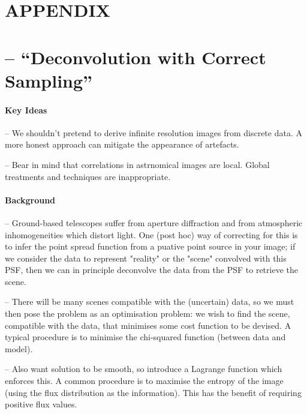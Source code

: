 \documentclass[letterpaper, 11pt]{article}
\begin{document}
\newpage
\appendix
{}
\section*{APPENDIX}

\section{\citet{MCS98} -- ``Deconvolution with Correct Sampling''}
\label{sec:MCS98notes}

\paragraph{Key Ideas}

-- We shouldn't pretend to derive infinite resolution images from discrete data. A more honest approach can mitigate the appearance of 
artefacts.

-- Bear in mind that correlations in astrnomical images are local. Global treatments and techniques are inappropriate.


\paragraph{Background}

-- Ground-based telescopes suffer from aperture diffraction and from atmospheric inhomogeneities which distort light. One (post hoc) way of 
correcting for this is to infer the point spread function from a puative point source in your image; if we consider the data to represent 
"reality" or the "scene" convolved with this PSF, then we can in principle deconvolve the data from the PSF to retrieve the scene. 

-- There will be many scenes compatible with the (uncertain) data, so we must then pose the problem as an optimisation problem: we wish to 
find the scene, compatible with the data, that minimises some cost function to be devised. A typical procedure is to minimise the chi-squared 
function (between data and model).

-- Also want solution to be smooth, so introduce a Lagrange function which enforces this. A common procedure is to maximise the entropy of the 
image (using the flux distribution as the information). This has the benefit of requiring positive flux values.
\end{document}
